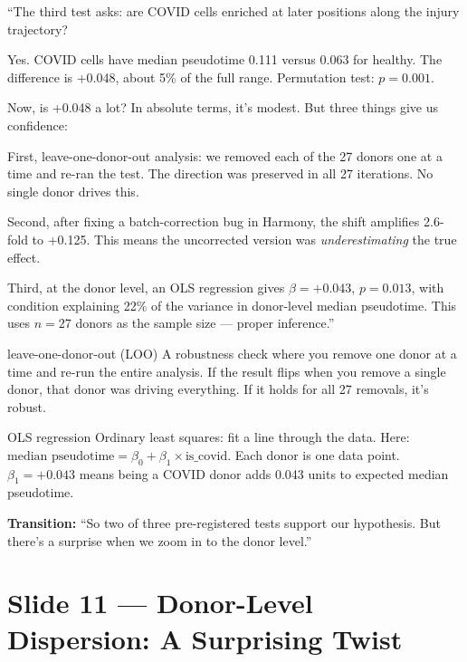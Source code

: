 \documentclass[11pt]{article}
\begin{document}
\begin{speaknote}
``The third test asks: are COVID cells enriched at later positions along the injury trajectory?

Yes. COVID cells have median pseudotime 0.111 versus 0.063 for healthy. The difference is +0.048, about 5\% of the full range. Permutation test: $p = 0.001$.

Now, is +0.048 a lot? In absolute terms, it's modest. But three things give us confidence:

First, leave-one-donor-out analysis: we removed each of the 27 donors one at a time and re-ran the test. The direction was preserved in all 27 iterations. No single donor drives this.

Second, after fixing a batch-correction bug in Harmony, the shift amplifies 2.6-fold to +0.125. This means the uncorrected version was \emph{underestimating} the true effect.

Third, at the donor level, an OLS regression gives $\beta = +0.043$, $p = 0.013$, with condition explaining 22\% of the variance in donor-level median pseudotime. This uses $n = 27$ donors as the sample size --- proper inference.''
\end{speaknote}

\begin{jargon}{leave-one-donor-out (LOO)}
A robustness check where you remove one donor at a time and re-run the entire analysis. If the result flips when you remove a single donor, that donor was driving everything. If it holds for all 27 removals, it's robust.
\end{jargon}

\begin{jargon}{OLS regression}
Ordinary least squares: fit a line through the data. Here: $\text{median pseudotime} = \beta_0 + \beta_1 \times \text{is\_covid}$. Each donor is one data point. $\beta_1 = +0.043$ means being a COVID donor adds 0.043 units to expected median pseudotime.
\end{jargon}

\textbf{Transition:} ``So two of three pre-registered tests support our hypothesis. But there's a surprise when we zoom in to the donor level.''


\section{Slide 11 --- Donor-Level Dispersion: A Surprising Twist}
\end{document}

